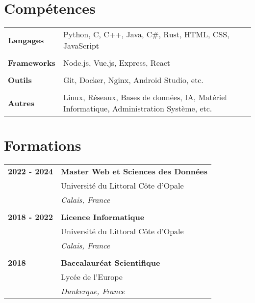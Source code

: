 \documentclass[a4paper, 12pt]{article}
\begin{document}
\begin{minipage}[t]{0.65\textwidth}

    \section*{\textcolor{sectioncolor}{Compétences}}
    \begin{tabular}{ m{} m{} }
        \textbf{Langages} & Python, C, C++, Java, C\#, Rust, HTML, CSS, JavaScript \\
        & \\
        \textbf{Frameworks} & Node.js, Vue.js, Express, React \\
        & \\
        \textbf{Outils} & Git, Docker, Nginx, Android Studio, etc. \\
        & \\
        \textbf{Autres} & Linux, Réseaux, Bases de données, IA, Matériel Informatique, Administration Système, etc. \\
    \end{tabular}

    \section*{\textcolor{sectioncolor}{Formations}}
    \begin{tabular}{ m{} m{} }
        \textbf{2022 - 2024} & \textbf{Master Web et Sciences des Données} \\
        & Université du Littoral Côte d'Opale \\
        & \textit{Calais, France} \\
        & \\
        \textbf{2018 - 2022} & \textbf{Licence Informatique} \\
        & Université du Littoral Côte d'Opale \\
        & \textit{Calais, France} \\
        & \\
        \textbf{2018} & \textbf{Baccalauréat Scientifique} \\
        & Lycée de l'Europe \\
        & \textit{Dunkerque, France} \\
    \end{tabular}


\end{minipage}
\end{document}
